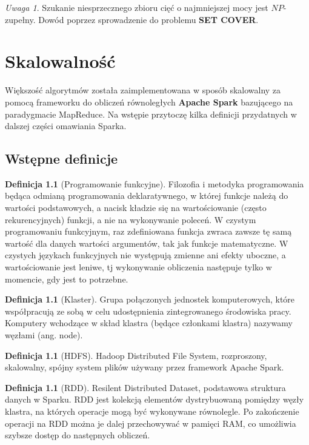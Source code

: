 \documentclass[magisterska]{pracamgr}
\theoremstyle{plain}
\theoremstyle{definition}
\newtheorem{definicja}[thm]{Definicja}
\theoremstyle{remark}
\newtheorem{uwaga}[thm]{Uwaga}
\begin{document}
\begin{uwaga}
Szukanie niesprzecznego zbioru cięć o najmniejszej mocy jest $NP$-zupełny.
Dowód poprzez sprowadzenie do problemu \textbf{SET COVER}.
\end{uwaga}


\chapter{Skalowalność}

Większość algorytmów została zaimplementowana w sposób skalowalny za pomocą frameworku 
do obliczeń równoległych \textbf{Apache Spark} bazującego na paradygmacie MapReduce.
Na wstępie przytoczę kilka definicji przydatnych w dalszej części omawiania Sparka.

\section{Wstępne definicje}
\begin{definicja}[Programowanie funkcyjne]
Filozofia i metodyka programowania będąca odmianą programowania deklaratywnego, 
w której funkcje należą do wartości podstawowych, a nacisk kładzie się na wartościowanie 
(często rekurencyjnych) funkcji, a nie na wykonywanie poleceń.
W czystym programowaniu funkcyjnym, raz zdefiniowana funkcja zwraca zawsze 
tę samą wartość dla danych wartości argumentów, tak jak funkcje matematyczne.
W czystych językach funkcyjnych nie występują zmienne ani efekty uboczne, 
a wartościowanie jest leniwe, tj wykonywanie obliczenia następuje tylko w momencie, gdy jest to potrzebne.
\end{definicja}

\begin{definicja}[Klaster]
Grupa połączonych jednostek komputerowych, które współpracują ze sobą w celu udostępnienia zintegrowanego środowiska pracy.
Komputery wchodzące w skład klastra (będące członkami klastra) nazywamy węzłami (ang. node).
\end{definicja}

\begin{definicja}[HDFS]
Hadoop Distributed File System, rozproszony, skalowalny, spójny system plików używany przez framework Apache Spark.
\end{definicja}

\begin{definicja}[RDD]
Resilent Distributed Dataset, podstawowa struktura danych w Sparku. RDD jest kolekcją elementów dystrybuowaną pomiędzy 
węzły klastra, na których operacje mogą być wykonywane równolegle. Po zakończenie operacji na RDD można je dalej 
przechowywać w pamięci RAM, co umożliwia szybsze dostęp do następnych obliczeń. 
\end{definicja}
\end{document}
